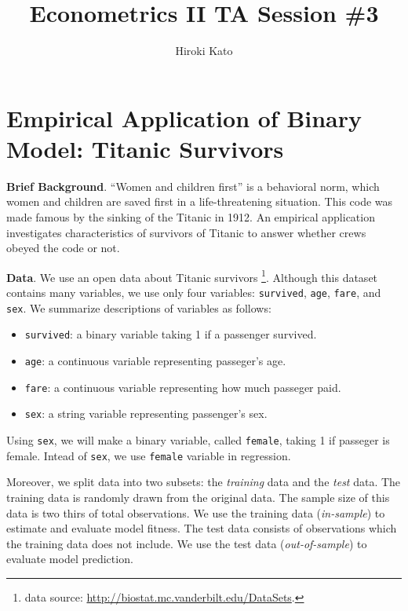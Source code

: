 \documentclass[
  12pt,
]{article}
\title{Econometrics II TA Session \#3}
\author{Hiroki Kato}
\date{}
\providecommand{\tightlist}{%
  \setlength{\itemsep}{0pt}\setlength{\parskip}{0pt}}
\begin{document}
\maketitle

\hypertarget{empirical-application-of-binary-model-titanic-survivors}{%
\section{Empirical Application of Binary Model: Titanic
Survivors}\label{empirical-application-of-binary-model-titanic-survivors}}

\textbf{Brief Background}. ``Women and children first'' is a behavioral
norm, which women and children are saved first in a life-threatening
situation. This code was made famous by the sinking of the Titanic in
1912. An empirical application investigates characteristics of survivors
of Titanic to answer whether crews obeyed the code or not.

\noindent \textbf{Data}. We use an open data about Titanic survivors
\footnote{data source: \url{http://biostat.mc.vanderbilt.edu/DataSets}.}.
Although this dataset contains many variables, we use only four
variables: \texttt{survived}, \texttt{age}, \texttt{fare}, and
\texttt{sex}. We summarize descriptions of variables as follows:

\begin{itemize}
\tightlist
\item
  \texttt{survived}: a binary variable taking 1 if a passenger survived.
\item
  \texttt{age}: a continuous variable representing passeger's age.
\item
  \texttt{fare}: a continuous variable representing how much passeger
  paid.
\item
  \texttt{sex}: a string variable representing passenger's sex.
\end{itemize}

Using \texttt{sex}, we will make a binary variable, called
\texttt{female}, taking 1 if passeger is female. Intead of \texttt{sex},
we use \texttt{female} variable in regression.

Moreover, we split data into two subsets: the \emph{training} data and
the \emph{test} data. The training data is randomly drawn from the
original data. The sample size of this data is two thirs of total
observations. We use the training data (\emph{in-sample}) to estimate
and evaluate model fitness. The test data consists of observations which
the training data does not include. We use the test data
(\emph{out-of-sample}) to evaluate model prediction.
\end{document}
